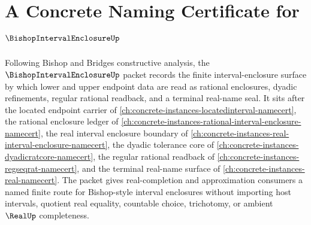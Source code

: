 \chapter{A Concrete Naming Certificate for $\BishopIntervalEnclosureUp$}
\label{ch:concrete-instances-bishop-interval-enclosure-namecert}

Following Bishop and Bridges constructive analysis, the $\BishopIntervalEnclosureUp$ packet records the finite interval-enclosure surface by which lower and upper endpoint data are read as rational enclosures, dyadic refinements, regular rational readback, and a terminal real-name seal. It sits after the located endpoint carrier of \autoref{ch:concrete-instances-locatedinterval-namecert}, the rational enclosure ledger of \autoref{ch:concrete-instances-rational-interval-enclosure-namecert}, the real interval enclosure boundary of \autoref{ch:concrete-instances-real-interval-enclosure-namecert}, the dyadic tolerance core of \autoref{ch:concrete-instances-dyadicratcore-namecert}, the regular rational readback of \autoref{ch:concrete-instances-regseqrat-namecert}, and the terminal real-name surface of \autoref{ch:concrete-instances-real-namecert}. The packet gives real-completion and approximation consumers a named finite route for Bishop-style interval enclosures without importing host intervals, quotient real equality, countable choice, trichotomy, or ambient $\RealUp$ completeness.

